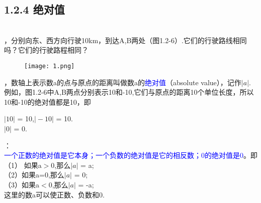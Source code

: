 \documentclass[UTF8]{article}
\begin{document}
	\subsection*{ 1.2.4 绝对值}\\
	，分别向东、西方向行驶10km，到达A,B两处（图1.2-6）.它们的行驶路线相同吗？它们的行驶路程相同？\\
	\begin{figure}[ht]
		\centering
		\texttt{[image: 1.png]}
	\end{figure}

	\begin{definition}
	，数轴上表示数a的点与原点的距离叫做数a的\textcolor{blue}{绝对值}（absolute value），记作$\vert a \vert$.例如，图1.2-6中A,B两点分别表示10和-10,它们与原点的距离10个单位长度，所以10和-10的绝对值都是10，即\\
	\end{definition}
	
	\indent$\vert 10 \vert$ = 10,$\vert -10 \vert$ = 10.\\
	$\vert 0 \vert$ = 0.\\
	
	\begin{propertory}
	：\\
	\indent\textcolor{blue}{一个正数的绝对值是它本身；一个负数的绝对值是它的相反数；0的绝对值是0}。即\\
	\indent（1） 如果a$>$0,那么$\vert a \vert$ = a;\\
	\indent（2）如果a=0,那么$\vert a \vert$ = 0;\\
	\indent（3）如果a$<$0,那么$\vert a \vert$ = -a;\\
	\indent 这里的数a可以使正数、负数和0.\\
	\end{propertory}
	
\end{document}
